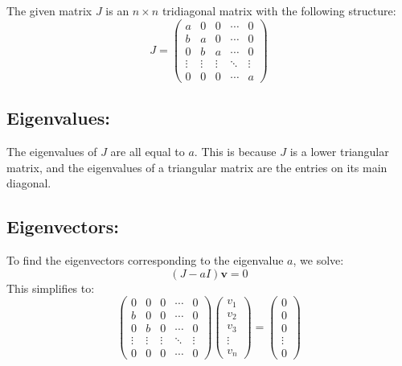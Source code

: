 \documentclass{article}
\begin{document}
The given matrix \( J \) is an \( n \times n \) tridiagonal matrix with the following structure:
\[
    J = \begin{pmatrix}
        a      & 0      & 0      & \cdots & 0      \\
        b      & a      & 0      & \cdots & 0      \\
        0      & b      & a      & \cdots & 0      \\
        \vdots & \vdots & \vdots & \ddots & \vdots \\
        0      & 0      & 0      & \cdots & a
    \end{pmatrix}
\]

\subsection*{Eigenvalues:}
The eigenvalues of \( J \) are all equal to \( a \). This is because \( J \) is a lower triangular matrix, and the eigenvalues of a triangular matrix are the entries on its main diagonal.

\subsection*{Eigenvectors:}
To find the eigenvectors corresponding to the eigenvalue \( a \), we solve:
\[
    (J - a I) \mathbf{v} = 0
\]
This simplifies to:
\[
    \begin{pmatrix}
        0      & 0      & 0      & \cdots & 0      \\
        b      & 0      & 0      & \cdots & 0      \\
        0      & b      & 0      & \cdots & 0      \\
        \vdots & \vdots & \vdots & \ddots & \vdots \\
        0      & 0      & 0      & \cdots & 0
    \end{pmatrix}
    \begin{pmatrix}
        v_1    \\
        v_2    \\
        v_3    \\
        \vdots \\
        v_n
    \end{pmatrix}
    =
    \begin{pmatrix}
        0      \\
        0      \\
        0      \\
        \vdots \\
        0
    \end{pmatrix}
\]
\end{document}
